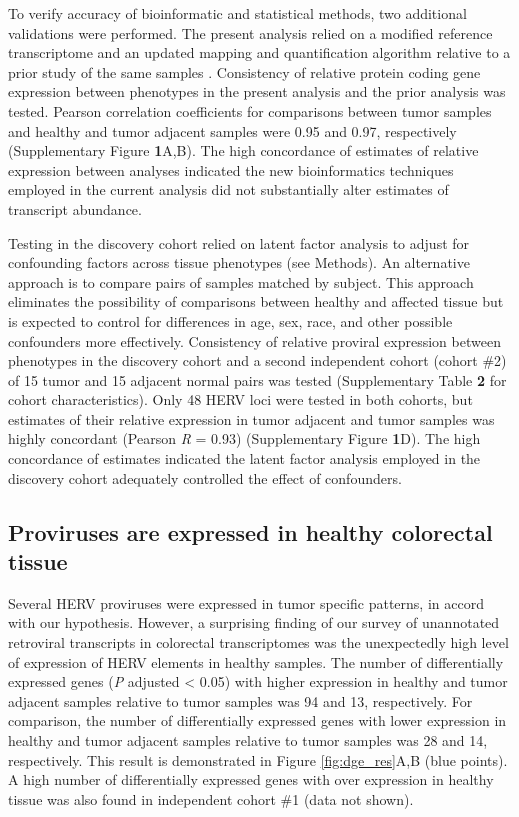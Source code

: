 To verify accuracy of bioinformatic and statistical methods, two additional validations were performed.
The present analysis relied on a modified reference transcriptome and an updated mapping and quantification algorithm relative to a prior study of the same samples \citep{Dampier2020}.
Consistency of relative protein coding gene expression between phenotypes in the present analysis and the prior analysis was tested.
Pearson correlation coefficients for comparisons between tumor samples and healthy and tumor adjacent samples were 0.95 and 0.97, respectively (Supplementary Figure \textbf{1}A,B).
The high concordance of estimates of relative expression between analyses indicated the new bioinformatics techniques employed in the current analysis did not substantially alter estimates of transcript abundance.

Testing in the discovery cohort relied on latent factor analysis to adjust for confounding factors across tissue phenotypes (see Methods).
An alternative approach is to compare pairs of samples matched by subject.
This approach eliminates the possibility of comparisons between healthy and affected tissue but is expected to control for differences in age, sex, race, and other possible confounders more effectively.
Consistency of relative proviral expression between phenotypes in the discovery cohort and a second independent cohort (cohort \#2) of 15 tumor and 15 adjacent normal pairs was tested (Supplementary Table \textbf{2} for cohort characteristics).
Only 48 HERV loci were tested in both cohorts, but estimates of their relative expression in tumor adjacent and tumor samples was highly concordant (Pearson \emph{R} = 0.93) (Supplementary Figure \textbf{1}D).
The high concordance of estimates indicated the latent factor analysis employed in the discovery cohort adequately controlled the effect of confounders.


\subsection*{Proviruses are expressed in healthy colorectal tissue}
Several HERV proviruses were expressed in tumor specific patterns, in accord with our hypothesis.
However, a surprising finding of our survey of unannotated retroviral transcripts in colorectal transcriptomes was the unexpectedly high level of expression of HERV elements in healthy samples.
The number of differentially expressed genes (\emph{P} adjusted < 0.05) with higher expression in healthy and tumor adjacent samples relative to tumor samples was 94 and 13, respectively.
For comparison, the number of differentially expressed genes with lower expression in healthy and tumor adjacent samples relative to tumor samples was 28 and 14, respectively.
This result is demonstrated in Figure \ref{fig:dge_res}A,B (blue points).
A high number of differentially expressed genes with over expression in healthy tissue was also found in independent cohort \#1 (data not shown).

